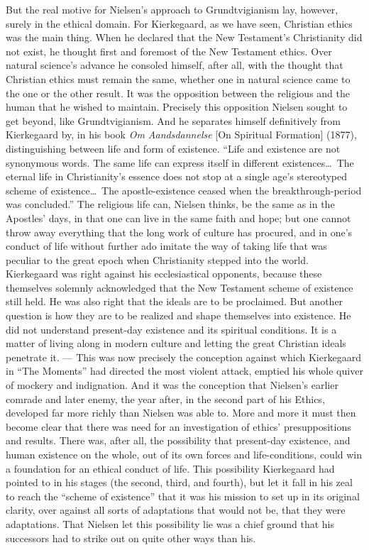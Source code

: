 \documentclass[12pt,a4paper]{book}
\newcommand{\opage}[1]{\marginnote{\footnotesize\textit{[#1]}}}
\begin{document}
But the real motive for Nielsen's approach to Grundtvigianism lay, however, surely in the
ethical domain. For Kierkegaard, as we have seen, Christian ethics was the main thing. When he
declared that the New Testament's Christianity did not exist, he thought first and foremost of
the New Testament ethics. Over natural science's advance he consoled himself, after all, with
the thought that Christian ethics must remain the same, whether one in natural science came to
the one or the other result. It was the opposition between the religious and the human that he
wished to maintain. Precisely this opposition Nielsen sought to get beyond, like
Grundtvigianism. And he separates himself definitively from Kierkegaard by, in his book \emph{Om
Aandsdannelse} [On Spiritual Formation] (1877), distinguishing between life and \opage{195}form of
existence. ``Life and existence are not synonymous words. The same life can express itself in
different existences\ldots\ The eternal life in Christianity's essence does not stop at a single
age's stereotyped scheme of existence\ldots\ The apostle-existence ceased when the
breakthrough-period was concluded.'' The religious life can, Nielsen thinks, be the same as in
the Apostles' days, in that one can live in the same faith and hope; but one cannot throw away
everything that the long work of culture has procured, and in one's conduct of life without
further ado imitate the way of taking life that was peculiar to the great epoch when Christianity
stepped into the world. Kierkegaard was right against his ecclesiastical opponents, because these
themselves solemnly acknowledged that the New Testament scheme of existence still held. He was
also right that the ideals are to be proclaimed. But another question is how they are to be
realized and shape themselves into existence. He did not understand present-day existence and its
spiritual conditions. It is a matter of living along in modern culture and letting the great
Christian ideals penetrate it. --- This was now precisely the conception against which Kierkegaard
in ``The Moments'' had directed the most violent attack, emptied his whole quiver of mockery and
indignation. And it was the conception that Nielsen's earlier comrade and later enemy, the year
after, in the second part of his Ethics, developed far more richly than Nielsen was able to. More
and more it must then become clear that there was need for an investigation of ethics'
presuppositions and results. There was, after all, the possibility that present-day existence,
and human existence on the whole, out of its own forces and life-conditions, could win a
foundation for an ethical conduct of life. This possibility Kierkegaard had pointed to in his
stages (the second, third, and fourth), but let it fall in his zeal to reach the ``scheme of
existence'' that it was his mission to set up in its original clarity, over against all sorts of
adaptations that would not be, that they were adaptations. That Nielsen let this possibility lie
was a chief ground that his successors had to strike out on quite other ways than his.
\end{document}
